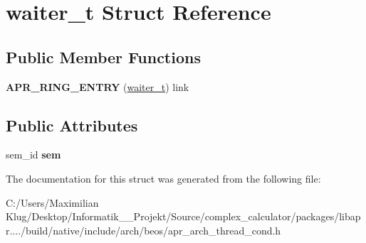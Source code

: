 \hypertarget{structwaiter__t}{}\section{waiter\+\_\+t Struct Reference}
\label{structwaiter__t}
\subsection*{Public Member Functions}
\begin{DoxyCompactItemize}
\item 
\mbox{\label{structwaiter__t_ab063b8f3e89face5df2e7e43aa6e0757}} 
{\bfseries A\+P\+R\+\_\+\+R\+I\+N\+G\+\_\+\+E\+N\+T\+RY} (\mbox{\hyperlink{structwaiter__t}{waiter\+\_\+t}}) link
\end{DoxyCompactItemize}
\subsection*{Public Attributes}
\begin{DoxyCompactItemize}
\item 
\mbox{\label{structwaiter__t_a08783f5b48e6925251baf38adbaa8175}} 
sem\+\_\+id {\bfseries sem}
\end{DoxyCompactItemize}


The documentation for this struct was generated from the following file\+:\begin{DoxyCompactItemize}
\item 
C\+:/\+Users/\+Maximilian Klug/\+Desktop/\+Informatik\+\_\+\_\+\+Projekt/\+Source/complex\+\_\+calculator/packages/libapr..../build/native/include/arch/beos/apr\+\_\+arch\+\_\+thread\+\_\+cond.\+h\end{DoxyCompactItemize}
